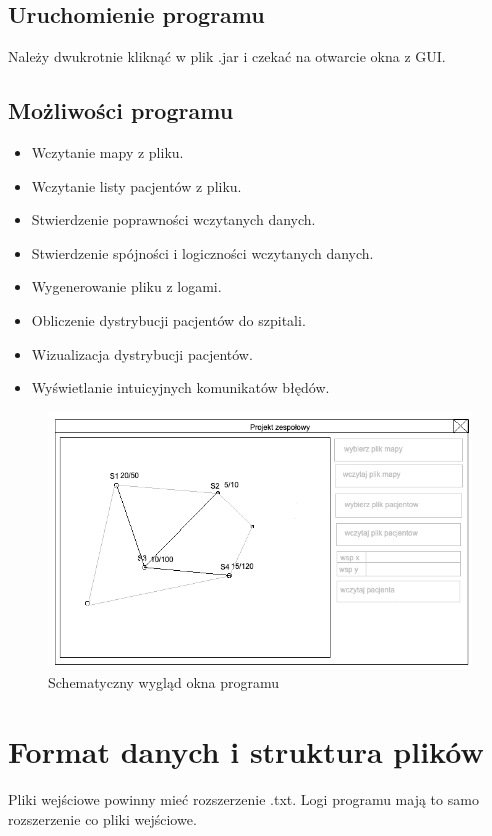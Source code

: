 \documentclass[11pt, a4paper]{article}
\begin{document}
    \subsection{Uruchomienie programu}
    Należy dwukrotnie kliknąć w plik .jar i czekać na otwarcie okna z GUI.
    \subsection{Możliwości programu}
    \begin{itemize}
        \item Wczytanie mapy z pliku.
        \item Wczytanie listy pacjentów z pliku.
        \item Stwierdzenie poprawności wczytanych danych.
        \item Stwierdzenie spójności i logiczności wczytanych danych.
        \item Wygenerowanie pliku z logami.
        \item Obliczenie dystrybucji pacjentów do szpitali.
        \item Wizualizacja dystrybucji pacjentów.
        \item Wyświetlanie intuicyjnych komunikatów błędów.
    \end{itemize}

\begin{figure}[ht]
    \centering
    \includegraphics[width=1\textwidth]{okno.png}
    \caption{Schematyczny wygląd okna programu}
    \label{fig:folder}
\end{figure}
    
\section{Format danych i struktura plików}
    Pliki wejściowe powinny mieć rozszerzenie .txt. Logi programu mają to samo rozszerzenie co pliki wejściowe.
\end{document}
